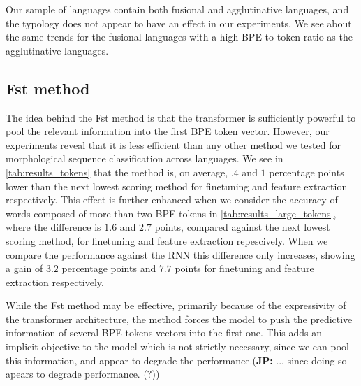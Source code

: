 \documentclass[11pt]{article}
\newcommand\jp[1]{(\textbf{JP:} #1)}
\newcommand\adam[1]{(\textbf{Adam:} #1)}
\begin{document}
        Our sample of languages contain both fusional and
     agglutinative languages, and the typology does not appear to have
     an effect in our experiments. We see about the same trends for
     the fusional languages with a high BPE-to-token ratio as the
     agglutinative languages.

    

    \subsection{Fst method}

            The idea behind the Fst method is that the transformer is
     sufficiently powerful to pool the relevant information into the
     first BPE token vector.
                            However, our experiments reveal that it is
     less efficient than any other method we tested for morphological
     sequence classification across languages. We see in
     \cref{tab:results_tokens} that the method is, on average, $.4$
     and $1$ percentage points lower than the next lowest scoring
     method for finetuning and feature extraction respectively.
             This effect is further enhanced when we consider the
     accuracy of words composed of more than two BPE tokens in
     \cref{tab:results_large_tokens}, where the difference is $1.6$
     and $2.7$ points, compared against the next lowest scoring
     method, for finetuning and feature extraction repescively. When
     we compare the performance against the RNN this difference only
     increases, showing a gain of $3.2$ percentage points and $7.7$
     points for finetuning and feature extraction respectively.

                         While the Fst method may be effective,
     primarily because of the expressivity of the transformer
     architecture, the method forces the model to push the predictive
     information of several BPE tokens vectors into the first one. This adds
     an implicit objective to the model which is not strictly
     necessary, since we can pool this information, and appear to
     degrade the performance.\jp{... since doing so apears to degrade performance. (?)}
\end{document}
